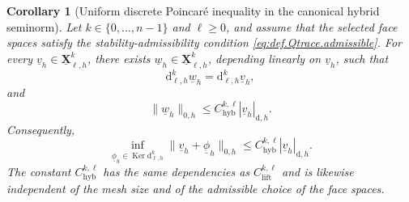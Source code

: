 \documentclass[a4paper,11pt]{article}
\newtheorem{corollary}[theorem]{Corollary}
\theoremstyle{definition}
\newcommand{\DIFF}{\mathrm{d}}
\newcommand{\uXh}[1]{\underline{\boldsymbol{X}}_{\ell,h}^{#1}}
\newcommand{\Ker}{\operatorname{Ker}}
\begin{document}
\begin{corollary}[Uniform discrete Poincar\'e inequality in the canonical hybrid seminorm]
\label{cor:hybrid.poincare}
Let $k\in\{0,\ldots,n-1\}$ and $\ell\geq0$, and assume that the selected face spaces satisfy the stability-admissibility condition \eqref{eq:def.Qtrace.admissible}.
For every $\underline v_h\in\uXh{k}$, there exists $\underline w_h\in\uXh{k}$, depending linearly on $\underline v_h$, such that
\begin{equation}\label{eq:main.poincare.same.derivative}
  \DIFF_{\ell,h}^{k}\underline w_h
  =
  \DIFF_{\ell,h}^{k}\underline v_h,
\end{equation}
and
\begin{equation}\label{eq:main.poincare.representative.estimate}
  \|\underline w_h\|_{0,h}
  \leq
  C_{\mathrm{hyb}}^{k,\ell}
  |\underline v_h|_{\DIFF,h}.
\end{equation}
Consequently,
\begin{equation}\label{eq:main.poincare.quotient}
  \inf_{\underline\phi_h\in\Ker\DIFF_{\ell,h}^{k}}
  \|\underline v_h+\underline\phi_h\|_{0,h}
  \leq
  C_{\mathrm{hyb}}^{k,\ell}
  |\underline v_h|_{\DIFF,h}.
\end{equation}
The constant $C_{\mathrm{hyb}}^{k,\ell}$ has the same dependencies as $C_{\mathrm{lift}}^{k,\ell}$ and is likewise independent of the mesh size and of the admissible choice of the face spaces.
\end{corollary}
\end{document}
